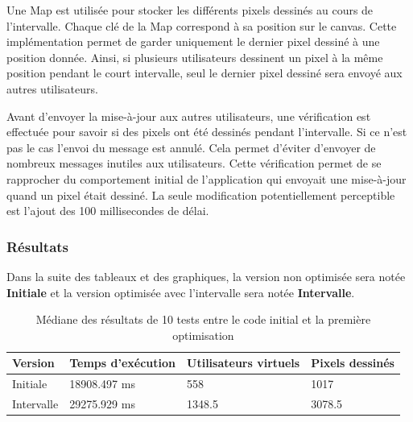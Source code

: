 Une Map est utilisée pour stocker les différents pixels dessinés au cours de l'intervalle. Chaque clé de la Map correspond à sa position sur le canvas. Cette implémentation permet de garder uniquement le dernier pixel dessiné à une position donnée. Ainsi, si plusieurs utilisateurs dessinent un pixel à la même position pendant le court intervalle, seul le dernier pixel dessiné sera envoyé aux autres utilisateurs.

Avant d'envoyer la mise-à-jour aux autres utilisateurs, une vérification est effectuée pour savoir si des pixels ont été dessinés pendant l'intervalle. Si ce n'est pas le cas l'envoi du message est annulé. Cela permet d'éviter d'envoyer de nombreux messages inutiles aux utilisateurs. Cette vérification permet de se rapprocher du comportement initial de l'application qui envoyait une mise-à-jour quand un pixel était dessiné. La seule modification potentiellement perceptible est l'ajout des 100 millisecondes de délai.

\subsubsection{Résultats}

Dans la suite des tableaux et des graphiques, la version non optimisée sera notée \textbf{Initiale} et la version optimisée avec l'intervalle sera notée \textbf{Intervalle}.







\begin{table}[H]
  \centering
  \begin{tabular}{|l|l|l|l|}
    \hline
    \textbf{Version} & \textbf{Temps d'exécution} & \textbf{Utilisateurs virtuels} & \textbf{Pixels dessinés} \\ \hline
    Initiale         & 18908.497 ms               & 558                            & 1017                     \\ \hline
    Intervalle       & 29275.929 ms               & 1348.5                         & 3078.5                   \\ \hline
  \end{tabular}
  \caption{Médiane des résultats de 10 tests entre le code initial et la première optimisation}
  \label{table:first-opti-results}
\end{table}

